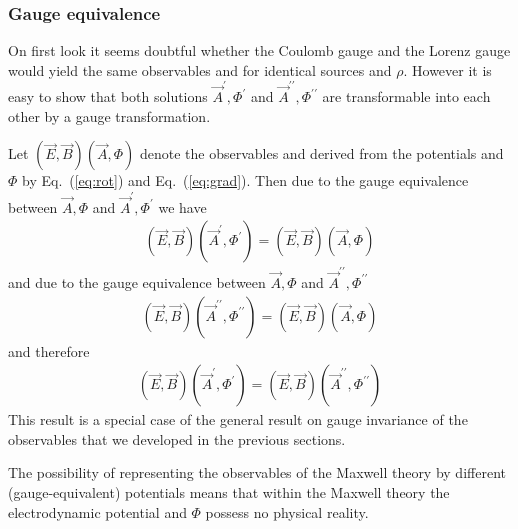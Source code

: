 \documentclass[10pt,a4paper]{article}
\newcommand*{\Eq}[1]{Eq.~(#1)}
\begin{document}
\subsubsection{Gauge equivalence}
On first look it seems doubtful whether the Coulomb gauge and the Lorenz
gauge would yield the same observables  and  for identical
sources  and $\rho$. However it is easy to show that both solutions 
$\vec{A}^\prime, \Phi^\prime$ and $\vec{A}^{\prime\prime}, \Phi^{\prime\prime}$
are transformable into each other by a gauge transformation.

Let $(\vec{E},\vec{B})(\vec{A},\Phi)$ denote the observables  and
 derived from the potentials  and $\Phi$ by \Eq{\ref{eq:rot}}
and \Eq{\ref{eq:grad}}. Then   due to the gauge equivalence between 
$\vec{A},\Phi$ and $\vec{A}^\prime,\Phi^\prime$ we have
\begin{align}
(\vec{E},\vec{B})(\vec{A}^\prime,\Phi^\prime)=(\vec{E},\vec{B})(\vec{A},\Phi)
\end{align}
and due to the gauge equivalence between $\vec{A},\Phi$ and
$\vec{A}^{\prime\prime},\Phi^{\prime\prime}$ 
\begin{align}
(\vec{E},\vec{B})(\vec{A}^{\prime\prime},\Phi^{\prime\prime})=
(\vec{E},\vec{B})(\vec{A},\Phi)
\end{align}
and therefore
\begin{align}
(\vec{E},\vec{B})(\vec{A}^\prime,\Phi^\prime)=
(\vec{E},\vec{B})(\vec{A}^{\prime\prime},\Phi^{\prime\prime})
\end{align}
This result is a special case of the general result on gauge invariance of
the observables that we developed in the previous sections.

The possibility of representing the observables of the Maxwell theory by
different  (gauge-equivalent) potentials means that within the Maxwell
theory the electrodynamic potential  and $\Phi$ possess no physical
reality. 
\end{document}
